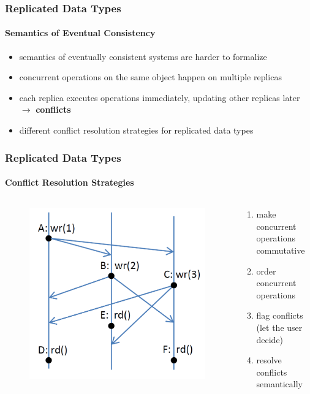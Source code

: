 \documentclass[11pt]{beamer}
\begin{document}
\begin{frame}
\frametitle{Replicated Data Types}
\framesubtitle{Semantics of Eventual Consistency}
\begin{itemize}
\item semantics of eventually consistent systems are harder to formalize
\item concurrent operations on the same object happen on multiple replicas
\item each replica executes operations immediately, updating other replicas later \(\rightarrow\) \textbf{conflicts}
\item different conflict resolution strategies for replicated data types
\end{itemize}
\end{frame}

\begin{frame}
\frametitle{Replicated Data Types}
\framesubtitle{Conflict Resolution Strategies}
\begin{columns}
\begin{column}{5cm}
\begin{figure}
\includegraphics[scale=0.3]{update_replicas_highres.png}
\end{figure}
\end{column}
\begin{column}{5cm}
\pause
\begin{enumerate}
\item make concurrent operations commutative
\pause
\item order concurrent operations
\pause
\item flag conflicts (let the user decide)
\pause
\item resolve conflicts semantically
\end{enumerate}
\end{column}
\end{columns}
\end{frame}
\end{document}
